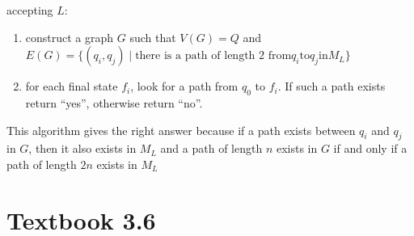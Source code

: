 \documentclass[defaultpackages]{simplereport}
\begin{document}
\begin{itemize}[label=]
    accepting $L$:
    \begin{enumerate}
      \item construct a graph $G$ such that $V(G) = Q$ and $E(G) = \{(q_i, q_j)
        \mid \text{there is a path of length 2 from} q_i \text{to} q_j \text{in}
        M_L\}$
       \item for each final state $f_i$, look for a path from $q_0$ to $f_i$. If
         such a path exists return ``yes'', otherwise return ``no''. 
      \end{enumerate}
   This algorithm gives the right answer because if a path exists between $q_i$
   and $q_j$ in $G$, then it also exists in $M_L$ and a path of length $n$
   exists in $G$ if and only if a path of length $2n$ exists in $M_L$
\end{itemize}
\section*{Textbook 3.6}
\end{document}
